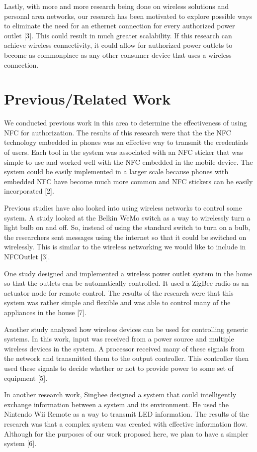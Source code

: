 \documentclass{sigchi}
\begin{document}
Lastly, with more and more research being done on wireless solutions and personal area networks, our research has been motivated to explore possible ways to eliminate the need for an ethernet connection for every authorized power outlet [3]. This could result in much greater scalability. If this research can achieve wireless connectivity, it could allow for authorized power outlets to become as commonplace as any other consumer device that uses a wireless connection.

\section{Previous/Related Work}
We conducted previous work in this area to determine the effectiveness of using NFC for authorization. The results of this research were that the the NFC technology embedded in phones was an effective way to transmit the credentials of users. Each tool in the system was associated with an NFC sticker that was simple to use and worked well with the NFC embedded in the mobile device. The system could be easily implemented in a larger scale because phones with embedded NFC have become much more common and NFC stickers can be easily incorporated [2].

Previous studies have also looked into using wireless networks to control some system. A study looked at the Belkin WeMo switch as a way to wirelessly turn a light bulb on and off. So, instead of using the standard switch to turn on a bulb, the researchers sent messages using the internet so that it could be switched on wirelessly. This is similar to the wireless networking we would like to include in NFCOutlet [3]. 

One study designed and implemented a wireless power outlet system in the home so that the outlets can be automatically controlled. It used a ZigBee radio as an actuator node for remote control. The results of the research were that this system was rather simple and flexible and was able to control many of the appliances in the house [7].

Another study analyzed how wireless devices can be used for controlling generic systems. In this work, input was received from a power source and multiple wireless devices in the system. A processor received many of these signals from the network and transmitted them to the output controller. This controller then used these signals to decide whether or not to provide power to some set of equipment [5].

In another research work, Singhee designed a system that could intelligently exchange information between a system and its environment. He used the Nintendo Wii Remote as a way to transmit LED information. The results of the research was that a complex system was created with effective information flow. Although for the purposes of our work proposed here, we plan to have a simpler system [6].
\end{document}
